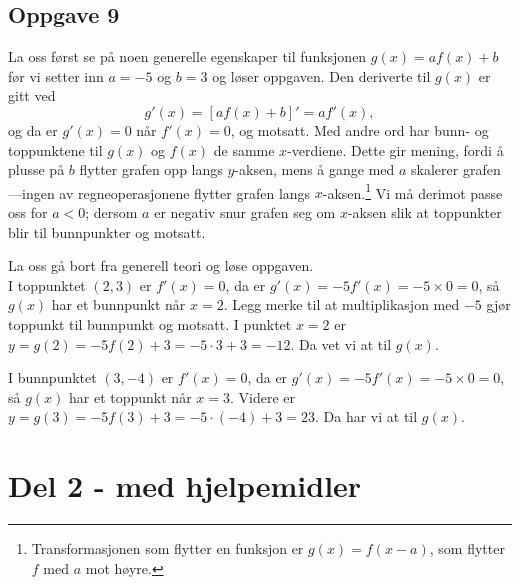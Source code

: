 \subsection*{Oppgave 9}
La oss først se på noen generelle egenskaper til funksjonen $g(x) = a f(x) + b$ før vi setter inn $a=-5$ og $b=3$ og løser oppgaven.
Den deriverte til $g(x)$ er gitt ved
\begin{equation*}
	g'(x) = \left[ a f(x) + b \right]' = a f'(x),
\end{equation*}
og da er $g'(x) = 0$ når $f'(x) = 0$, og motsatt.
Med andre ord har bunn- og toppunktene til $g(x)$ og $f(x)$ de samme $x$-verdiene. Dette gir mening, fordi å plusse på $b$ flytter grafen opp langs $y$-aksen, mens å gange med $a$ skalerer grafen---ingen av regneoperasjonene flytter grafen langs $x$-aksen.\footnote{Transformasjonen som flytter en funksjon er $g(x) = f(x - a)$, som flytter $f$ med $a$ mot høyre.}
Vi må derimot passe oss for $a < 0$; dersom $a$ er negativ snur grafen seg om $x$-aksen slik at toppunkter blir til bunnpunkter og motsatt.

La oss gå bort fra generell teori og løse oppgaven. \\
I toppunktet $(2, 3)$ er $f'(x) = 0$, da er $g'(x) = -5 f'(x) = -5 \times 0 = 0$, så $g(x)$ har et bunnpunkt når $x = 2$. 
Legg merke til at multiplikasjon med $-5$ gjør toppunkt til bunnpunkt og motsatt. 
I punktet $x=2$ er $y = g(2) = -5 f(2) + 3 = -5 \cdot 3 +3 = -12$. 
Da vet vi at  til $g(x)$.

I bunnpunktet $(3, -4)$ er $f'(x) = 0$, da er $g'(x) = -5 f'(x) = -5 \times 0 = 0$, så $g(x)$ har et toppunkt når $x = 3$. 
Videre er $y = g(3) = -5 f(3) + 3 = -5 \cdot (-4) + 3 = 23$. 
Da har vi at  til $g(x)$.









\section*{Del 2 - med hjelpemidler}

